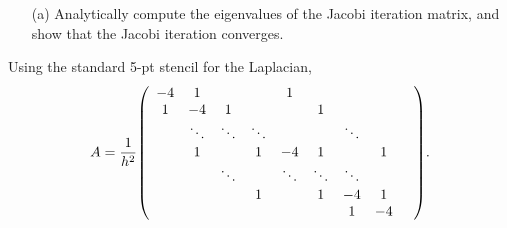 \documentclass[12pt]{article}
\begin{document}
\begin{itemize}
\item[(a)] Analytically compute the eigenvalues of the Jacobi iteration matrix, and show that the Jacobi iteration converges. 
\end{itemize}
Using the standard 5-pt stencil for the Laplacian, 
$$A = \dfrac{1}{h^2}\qty(\begin{array}{ccccccccc}
                    -4 & 1 & & & 1& & & & \\
                    1 & -4 & 1 & & & 1& & &\\
                    & \ddots & \ddots & \ddots & & & \ddots  & \\
                    & 1 &  & 1 & -4 & 1 &  & 1 &  \\
                    & &\ddots &  & \ddots & \ddots & \ddots & &  \\
                    & & & 1  & & 1 & -4 & 1 \\
                    & & & & & & 1 & -4
                \end{array}). $$
\end{document}
